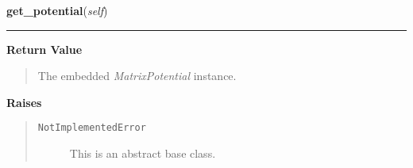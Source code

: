 \hspace{.8\funcindent}\begin{boxedminipage}{\funcwidth}

    \raggedright \textbf{get\_potential}(\textit{self})

    \vspace{-1.5ex}

    \rule{\textwidth}{0.5\fboxrule}
\setlength{\parskip}{2ex}
\setlength{\parskip}{1ex}
      \textbf{Return Value}
    \vspace{-1ex}

      \begin{quote}
      The embedded \textit{MatrixPotential} instance.

      \end{quote}

      \textbf{Raises}
    \vspace{-1ex}

      \begin{quote}
        \begin{description}

          \item[\texttt{NotImplementedError}]

          This is an abstract base class.

        \end{description}

      \end{quote}

    \end{boxedminipage}


    \label{Propagator:Propagator:get_wavefunction}

    \vspace{0.5ex}

